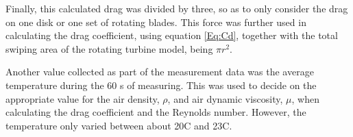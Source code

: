 Finally, this calculated drag was divided by three, so as to only consider the drag on one disk or one set of rotating blades. This force was further used in calculating the drag coefficient, using equation \ref{Eq:Cd}, together with the total swiping area of the rotating turbine model, being $\pi r^2$.

Another value collected as part of the measurement data was the average temperature during the 60 \si{\s} of measuring. This was used to decide on the appropriate value for the air density, $\rho$, and air dynamic viscosity, $\mu$, when calculating the drag coefficient and the Reynolds number. However, the temperature only varied between about 20\degree C and 23\degree C. 



